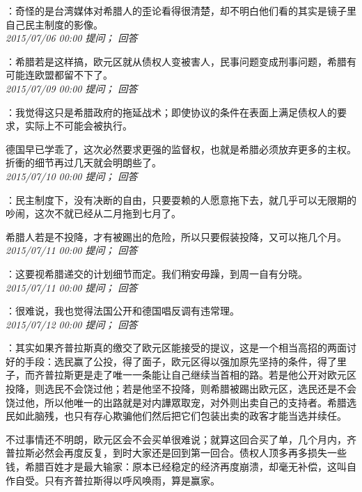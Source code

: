 \documentclass[twocolumn]{ctexart}
\begin{document}
：奇怪的是台湾媒体对希腊人的歪论看得很清楚，却不明白他们看的其实是镜子里自己民主制度的影像。\\

\textit{\hfill\noindent\small 2015/07/06 00:00 提问； 回答}

：希腊若是这样搞，欧元区就从债权人变被害人，民事问题变成刑事问题，希腊有可能连欧盟都留不下了。\\

\textit{\hfill\noindent\small 2015/07/09 00:00 提问； 回答}

：我觉得这只是希腊政府的拖延战术；即使协议的条件在表面上满足债权人的要求，实际上不可能会被执行。

德国早已学乖了，这次必然要求更强的监督权，也就是希腊必须放弃更多的主权。折衝的细节再过几天就会明朗些了。\\

\textit{\hfill\noindent\small 2015/07/10 00:00 提问； 回答}

：民主制度下，没有决断的自由，只要耍赖的人愿意拖下去，就几乎可以无限期的吵闹，这次不就已经从二月拖到七月了。

希腊人若是不投降，才有被踢出的危险，所以只要假装投降，又可以拖几个月。\\

\textit{\hfill\noindent\small 2015/07/11 00:00 提问； 回答}

：这要视希腊递交的计划细节而定。我们稍安毋躁，到周一自有分晓。\\

\textit{\hfill\noindent\small 2015/07/11 00:00 提问； 回答}

：很难说，我也觉得法国公开和德国唱反调有违常理。\\

\textit{\hfill\noindent\small 2015/07/12 00:00 提问； 回答}

：其实如果齐普拉斯真的缴交了欧元区能接受的提议，这是一个相当高招的两面讨好的手段：选民赢了公投，得了面子，欧元区得以强加原先坚持的条件，得了里子，而齐普拉斯更是走了唯一一条能让自己继续当首相的路。若是他公开对欧元区投降，则选民不会饶过他；若是他坚不投降，则希腊被踢出欧元区，选民还是不会饶过他，所以他唯一的出路就是对内譁眾取宠，对外则出卖自己的支持者。希腊选民如此脑残，也只有存心欺骗他们然后把它们包装出卖的政客才能当选并续任。

不过事情还不明朗，欧元区会不会买单很难说；就算这回合买了单，几个月内，齐普拉斯必然会再度反复，到时大家还是回到第一回合。债权人顶多再多损失一些钱，希腊百姓才是最大输家：原本已经稳定的经济再度崩溃，却毫无补偿，这叫自作自受。只有齐普拉斯得以呼风唤雨，算是赢家。
\end{document}
